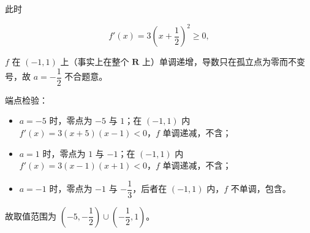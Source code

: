 \begin{answer}
此时

\nopagebreak[4]
\[f'(x)=3\left(x+\frac12\right)^2\geqslant0,\]

$f$ 在 $(-1,1)$ 上（事实上在整个 $\mathbf R$ 上）单调递增，导数只在孤立点为零而不变号，故 $a=-\dfrac12$ 不合题意。

端点检验：

\begin{itemize}
\item $a=-5$ 时，零点为 $-5$ 与 $1$；在 $(-1,1)$ 内 $f'(x)=3(x+5)(x-1)<0$，$f$ 单调递减，不含；
\item $a=1$ 时，零点为 $1$ 与 $-1$；在 $(-1,1)$ 内 $f'(x)=3(x-1)(x+1)<0$，$f$ 单调递减，不含；
\item $a=-1$ 时，零点为 $-1$ 与 $-\dfrac13$，后者在 $(-1,1)$ 内，$f$ 不单调，包含。
\end{itemize}

故取值范围为 $\left(-5,-\dfrac12\right)\cup\left(-\dfrac12,1\right)$。


\end{answer}
